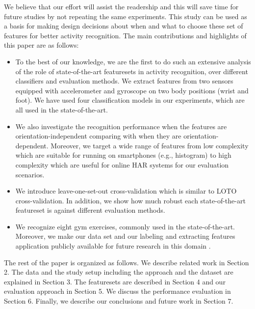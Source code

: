 \documentclass[journal,article,submit,moreauthors,pdftex]{Definitions/mdpi}
\begin{document}
We believe that our effort will assist the readership and this will save time for future studies by not repeating the same experiments. This study can be used as a basis for making design decisions about when and what to choose these set of features for better activity recognition. The main contributions and highlights of this paper are as follows:


\begin{itemize}
	\item To the best of our knowledge, we are the first to do such an extensive analysis of the role of state-of-the-art featuresets in activity recognition, over different classifiers and evaluation methods. We extract features from two sensors equipped with accelerometer and gyroscope on two body positions (wrist and foot). We have used four classification models in our experiments, which are all used in the state-of-the-art. 
	\item We also investigate the recognition performance when the features are orientation-independent comparing with when they are orientation-dependent. Moreover, we target a wide range of features from low complexity which are suitable for running on smartphones (e.g., histogram) to high complexity which are useful for online HAR systems\cite{morris2014recofit} for our evaluation scenarios.
	\item We introduce leave-one-set-out cross-validation which is similar to LOTO cross-validation. In addition, we show how much robust each state-of-the-art featureset is against different evaluation methods.
	\item We recognize eight gym exercises, commonly used in the state-of-the-art. Moreover, we make our data set and our labeling and extracting features application publicly available for future research in this domain \cite{gymDataset}.
\end{itemize}


The rest of the paper is organized as follows. We describe related work in Section 2. The data and the study setup including the approach and the dataset are explained in Section 3. The featuresets are described in Section 4 and our evaluation approach in Section 5. We discuss the performance evaluation in Section 6. Finally, we describe our conclusions and future work in Section 7.
\end{document}
